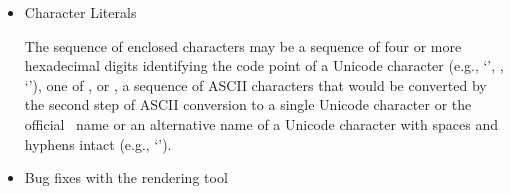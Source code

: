 \begin{itemize}
\item {} Character Literals

The sequence of enclosed characters may be
a sequence of four or more hexadecimal digits
identifying the code point of a Unicode character
(e.g., `', , `'),
one of ,  or ,
a sequence of ASCII characters
that would be converted by the second step of ASCII conversion
to a single Unicode character or
the official \unicode\ name or an alternative name
of a Unicode character
with spaces and hyphens intact
(e.g., `').

\item Bug fixes with the rendering tool


\end{itemize}


